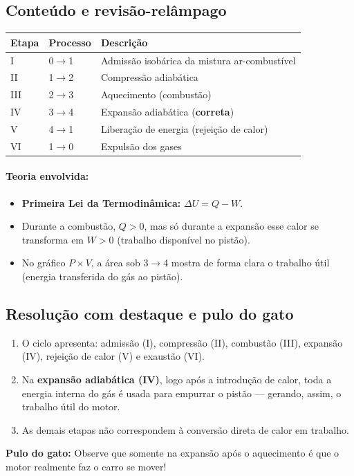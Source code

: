 \documentclass{article}
\begin{document}
\subsection*{Conteúdo e revisão-relâmpago}
\begin{table}[h!]
    \centering
    \begin{tabular}{l|l|l}
        \textbf{Etapa} & \textbf{Processo} & \textbf{Descrição} \\
        \hline
        I & 0\(\rightarrow\)1 & Admissão isobárica da mistura ar-combustível \\
        II & 1\(\rightarrow\)2 & Compressão adiabática \\
        III & 2\(\rightarrow\)3 & Aquecimento (combustão) \\
        IV & 3\(\rightarrow\)4 & Expansão adiabática (\textbf{correta}) \\
        V & 4\(\rightarrow\)1 & Liberação de energia (rejeição de calor) \\
        VI & 1\(\rightarrow\)0 & Expulsão dos gases \\
    \end{tabular}
\end{table}

\paragraph{Teoria envolvida:}
\begin{itemize}
    \item \textbf{Primeira Lei da Termodinâmica:} $\Delta U = Q - W$.
    \item Durante a combustão, $Q>0$, mas só durante a expansão esse calor se transforma em $W>0$ (trabalho disponível no pistão).
    \item No gráfico $P\times V$, a área sob 3$\rightarrow$4 mostra de forma clara o trabalho útil (energia transferida do gás ao pistão).
\end{itemize}

\subsection*{Resolução com destaque e pulo do gato}
\begin{enumerate}
    \item O ciclo apresenta: admissão (I), compressão (II), combustão (III), expansão (IV), rejeição de calor (V) e exaustão (VI).
    \item Na \textbf{expansão adiabática (IV)}, logo após a introdução de calor, toda a energia interna do gás é usada para empurrar o pistão — gerando, assim, o trabalho útil do motor.
    \item As demais etapas não correspondem à conversão direta de calor em trabalho.
\end{enumerate}
\textbf{Pulo do gato:} Observe que somente na expansão após o aquecimento é que o motor realmente faz o carro se mover!
\end{document}
